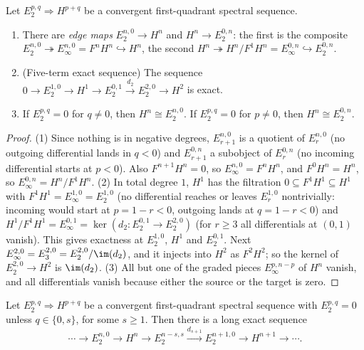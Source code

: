 \begin{proposition}\label{homological-algebra:proposition-edge-maps}
Let $E_2^{p,q} \Rightarrow H^{p+q}$ be a convergent first-quadrant spectral sequence.
\begin{enumerate}
\item There are \emph{edge maps} $E_2^{n,0} \to H^n$ and $H^n \to E_2^{0,n}$: the first is the composite
$E_2^{n,0} \twoheadrightarrow E_\infty^{n,0} = F^nH^n \hookrightarrow H^n$, the second $H^n \twoheadrightarrow H^n/F^1H^n = E_\infty^{0,n} \hookrightarrow E_2^{0,n}$.
\item (Five-term exact sequence) The sequence
$0 \to E_2^{1,0} \to H^1 \to E_2^{0,1} \xrightarrow{d_2} E_2^{2,0} \to H^2$ is exact.
\item If $E_2^{p,q} = 0$ for $q \neq 0$, then $H^n \cong E_2^{n,0}$. If $E_2^{p,q} = 0$ for $p \neq 0$, then $H^n \cong E_2^{0,n}$.
\end{enumerate}
\end{proposition}

\begin{proof}
(1) Since nothing is in negative degrees, $E_{r+1}^{n,0}$ is a quotient of $E_r^{n,0}$ (no outgoing differential lands in $q < 0$) and
$E_{r+1}^{0,n}$ a subobject of $E_r^{0,n}$ (no incoming differential starts at $p < 0$). Also $F^{n+1}H^n = 0$, so
$E_\infty^{n,0} = F^nH^n$, and $F^0H^n = H^n$, so $E_\infty^{0,n} = H^n/F^1H^n$.
(2) In total degree $1$, $H^1$ has the filtration $0 \subseteq F^1H^1 \subseteq H^1$ with $F^1H^1 = E_\infty^{1,0} = E_2^{1,0}$ (no differential
reaches or leaves $E_r^{1,0}$ nontrivially: incoming would start at $p = 1 - r < 0$, outgoing lands at $q = 1 - r < 0$) and
$H^1/F^1H^1 = E_\infty^{0,1} = \ker(d_2 \colon E_2^{0,1} \to E_2^{2,0})$ (for $r \geq 3$ all differentials at $(0,1)$ vanish). This gives
exactness at $E_2^{1,0}$, $H^1$ and $E_2^{0,1}$. Next $E_\infty^{2,0} = E_3^{2,0} = E_2^{2,0}/\im(d_2)$, and it injects into $H^2$ as
$F^2H^2$; so the kernel of $E_2^{2,0} \to H^2$ is $\im(d_2)$.
(3) All but one of the graded pieces $E_\infty^{p, n-p}$ of $H^n$ vanish, and all differentials vanish because either the source or the
target is zero.
\end{proof}

\begin{proposition}\label{homological-algebra:proposition-two-rows}
Let $E_2^{p,q} \Rightarrow H^{p+q}$ be a convergent first-quadrant spectral sequence with $E_2^{p,q} = 0$ unless $q \in \{0, s\}$, for some
$s \geq 1$. Then there is a long exact sequence
\[
\cdots \to E_2^{n,0} \to H^n \to E_2^{n-s,s} \xrightarrow{d_{s+1}} E_2^{n+1,0} \to H^{n+1} \to \cdots.
\]
\end{proposition}

